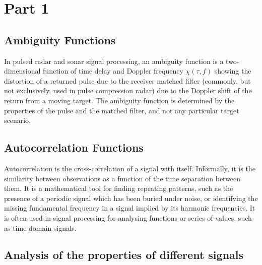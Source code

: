 \documentclass{article}
\begin{document}

\section{Part 1}
\label{sec:part1}
\subsection{Ambiguity Functions}
In pulsed radar and sonar signal processing, an ambiguity function is a two-dimensional function of time delay and Doppler frequency $\chi(\tau,f)$ showing the distortion of a returned pulse due to the receiver matched filter (commonly, but not exclusively, used in pulse compression radar) due to the Doppler shift of the return from a moving target. The ambiguity function is determined by the properties of the pulse and the matched filter, and not any particular target scenario. \cite{Wiki:2012ambi}

\subsection{Autocorrelation Functions}
Autocorrelation is the cross-correlation of a signal with itself. Informally, it is the similarity between observations as a function of the time separation between them. It is a mathematical tool for finding repeating patterns, such as the presence of a periodic signal which has been buried under noise, or identifying the missing fundamental frequency in a signal implied by its harmonic frequencies. It is often used in signal processing for analysing functions or series of values, such as time domain signals. \cite{Wiki:2012auto}

\subsection{Analysis of the properties of different signals}
\end{document}
